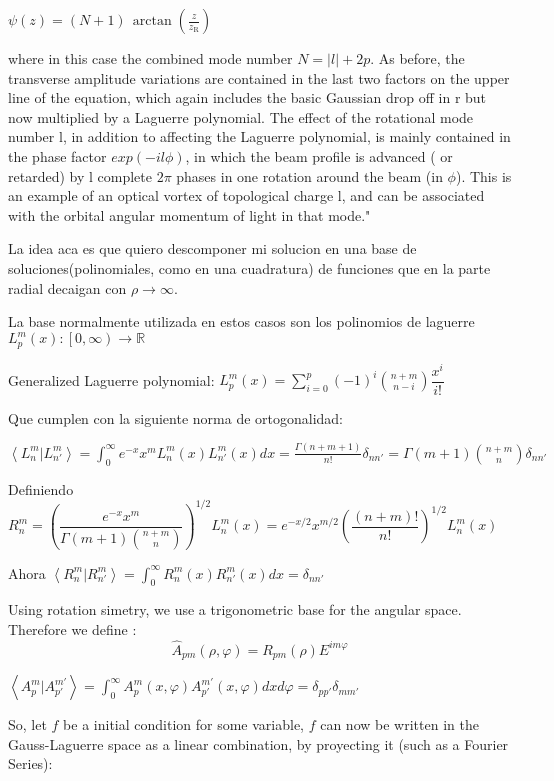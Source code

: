 \documentclass[a4paper,11pt,spanish,sans]{exam}
\begin{document}
$\psi(z)  = (N+1) \, \arctan \left( \frac{z}{z_\mathrm{R}} \right) $

where in this case the combined mode number $N = |l| + 2p$. As before, the transverse amplitude variations are contained in the last two factors on the upper line of the equation, which again includes the basic Gaussian drop off in r but now multiplied by a Laguerre polynomial. The effect of the rotational mode number l, in addition to affecting the Laguerre polynomial, is mainly contained in the phase factor $exp(-il\phi)$, in which the beam profile is advanced ( or retarded) by l complete $2\pi $ phases in one rotation around the beam (in $\phi$). This is an example of an optical vortex of topological charge l, and can be associated with the orbital angular momentum of light in that mode."


La idea aca es que quiero descomponer mi solucion en una base de soluciones(polinomiales, como en una cuadratura) de funciones que en la parte radial decaigan con $\rho \longrightarrow \infty$.

La base normalmente utilizada en estos casos son los polinomios de laguerre $L^m_p(x): \left[ 0, \infty \right) \longrightarrow \mathbb{R}$

Generalized Laguerre polynomial: $L^m_p(x)=\sum_{i=0}^p (-1)^i {n+m \choose n-i}\dfrac{x^i}{i!}$

Que cumplen con la siguiente norma de ortogonalidad:

 $\left \langle L_n^m | L_{n'}^{m} \right \rangle = \int_0^\infty e^{-x} x^{m} L_n^m(x) L_{n'}^{m}(x) dx = \frac{\Gamma(n+m+1)}{n!} \delta_{nn'}=\Gamma(m+1){n+m \choose n} \delta_{nn'} $

Definiendo 
$R_n^m=(\dfrac{e^{-x} x^{m}}{\Gamma(m+1){n+m \choose n}})^{1/2}  L_n^m(x)=e^{-x/2} x^{m/2}(\dfrac{(n+m)!}{n!})^{1/2}  L_n^m(x)$

Ahora $\left \langle R_n^m | R_{n'}^{m} \right \rangle = \int_0^\infty R_n^m(x) R_{n'}^{m}(x) dx = \delta_{nn'} $

Using rotation simetry, we use a trigonometric base for the angular space. Therefore we define : 
\[\hat{A}_{pm}(\rho,\varphi)=R_{pm}(\rho)E^{im\varphi}\]


$\left \langle A_p^m | A_{p'}^{m'} \right \rangle = \int_0^\infty A_p^m(x,\varphi) A_{p'}^{m'}(x,\varphi) dx d\varphi = \delta_{pp'}\delta_{mm'}$

So, let $f$ be a initial condition for some variable,  $f$ can now be written in the Gauss-Laguerre space as a linear combination, by proyecting it (such as a Fourier Series):
\end{document}
